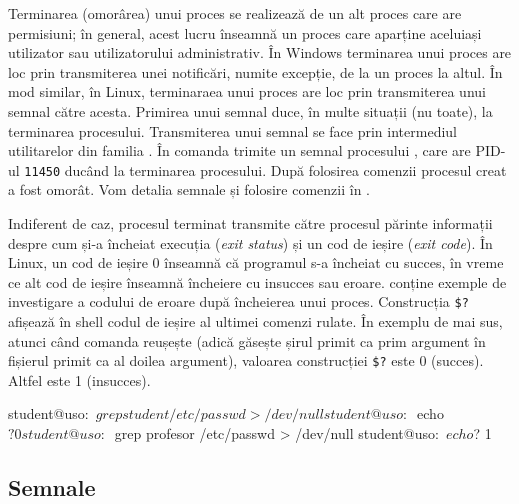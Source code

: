 Terminarea (omorârea) unui proces se realizează de un alt proces care are permisiuni;
în general, acest lucru înseamnă un proces care aparține aceluiași utilizator sau utilizatorului administrativ.
În Windows terminarea unui proces are loc prin transmiterea unei notificări, numite excepție, de la un proces la altul.
În mod similar, în Linux, terminaraea unui proces are loc prin transmiterea unui semnal către acesta.
Primirea unui semnal duce, în multe situații (nu toate), la terminarea procesului.
Transmiterea unui semnal se face prin intermediul utilitarelor din familia .
În  comanda  trimite un semnal procesului , care are PID-ul \texttt{11450} ducând la terminarea procesului.
După folosirea comenzii  procesul creat a fost omorât.
Vom detalia semnale și folosire comenzii  în .


Indiferent de caz, procesul terminat transmite către procesul părinte informații despre cum și-a încheiat execuția (\textit{exit status}) și un cod de ieșire (\textit{exit code}).
În Linux, un cod de ieșire 0 înseamnă că programul s-a încheiat cu succes, în vreme ce alt cod de ieșire înseamnă încheiere cu insucces sau eroare.
 conține exemple de investigare a codului de eroare după încheierea unui proces.
Construcția \texttt{\$?} afișează în shell codul de ieșire al ultimei comenzi rulate.
În exemplu de mai sus, atunci când comanda  reușește (adică găsește șirul primit ca prim argument în fișierul primit ca al doilea argument), valoarea construcției \texttt{\$?} este 0 (succes).
Altfel este 1 (insucces).

\begin{screen}[caption={Investigarea codului de ieșire al unui process},label={lst:process:exit-code}]
student@uso:~$ grep student /etc/passwd > /dev/null
student@uso:~$ echo $?
0
student@uso:~$ grep profesor /etc/passwd > /dev/null
student@uso:~$ echo $?
1
\end{screen}

\subsection{Semnale}
\label{sec:process:signal}

